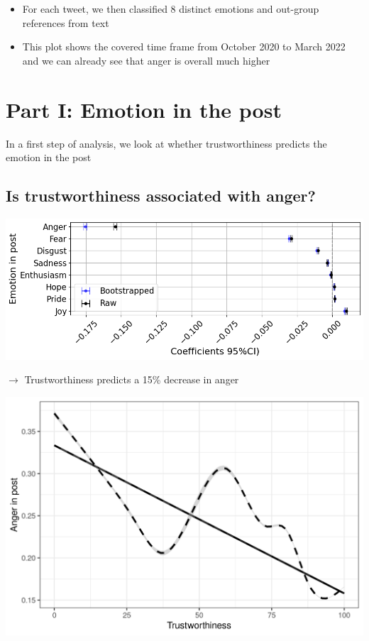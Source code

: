 \documentclass[
  letterpaper,
  DIV=11,
  numbers=noendperiod]{scrartcl}
\providecommand{\tightlist}{%
  \setlength{\itemsep}{0pt}\setlength{\parskip}{0pt}}\usepackage{longtable,booktabs,array}
\begin{document}
\begin{itemize}
\tightlist
\item
  For each tweet, we then classified 8 distinct emotions and out-group
  references from text
\item
  This plot shows the covered time frame from October 2020 to March 2022
  and we can already see that anger is overall much higher
\end{itemize}

\hypertarget{part-i-emotion-in-the-post}{%
\section{Part I: Emotion in the post}\label{part-i-emotion-in-the-post}}

In a first step of analysis, we look at whether trustworthiness predicts
the emotion in the post

\hypertarget{is-trustworthiness-associated-with-anger}{%
\subsection{Is trustworthiness associated with
anger?}\label{is-trustworthiness-associated-with-anger}}

\includegraphics[width=6.25in,height=\textheight]{images/emo_in_post_coeff_boot.png}

\(\rightarrow\) Trustworthiness predicts a 15\% decrease in anger

\includegraphics[width=10.41667in,height=\textheight]{images/anger_score_loess.png}
\end{document}
